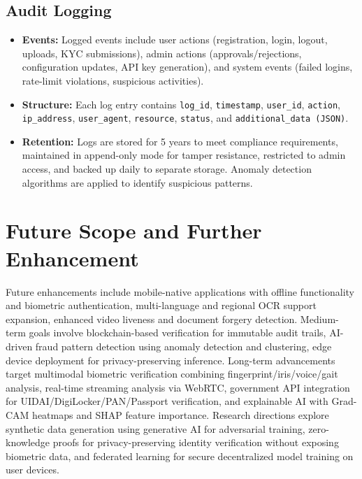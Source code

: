\documentclass[12pt,a4paper]{article}
\begin{document}
\subsection{Audit Logging}

\begin{itemize}
    \item \textbf{Events:} Logged events include user actions (registration, login, logout, uploads, KYC submissions), admin actions (approvals/rejections, configuration updates, API key generation), and system events (failed logins, rate-limit violations, suspicious activities).
    \item \textbf{Structure:} Each log entry contains \texttt{log\_id}, \texttt{timestamp}, \texttt{user\_id}, \texttt{action}, \texttt{ip\_address}, \texttt{user\_agent}, \texttt{resource}, \texttt{status}, and \texttt{additional\_data (JSON)}.
    \item \textbf{Retention:} Logs are stored for 5 years to meet compliance requirements, maintained in append-only mode for tamper resistance, restricted to admin access, and backed up daily to separate storage. Anomaly detection algorithms are applied to identify suspicious patterns.
\end{itemize}


\section{Future Scope and Further Enhancement}

Future enhancements include mobile-native applications with offline functionality and biometric authentication, multi-language and regional OCR support expansion, enhanced video liveness and document forgery detection. Medium-term goals involve blockchain-based verification for immutable audit trails, AI-driven fraud pattern detection using anomaly detection and clustering, edge device deployment for privacy-preserving inference. Long-term advancements target multimodal biometric verification combining fingerprint/iris/voice/gait analysis, real-time streaming analysis via WebRTC, government API integration for UIDAI/DigiLocker/PAN/Passport verification, and explainable AI with Grad-CAM heatmaps and SHAP feature importance. Research directions explore synthetic data generation using generative AI for adversarial training, zero-knowledge proofs for privacy-preserving identity verification without exposing biometric data, and federated learning for secure decentralized model training on user devices.
\end{document}
